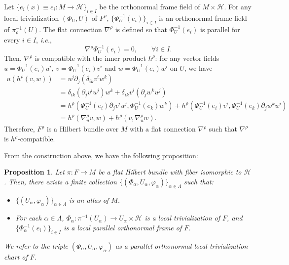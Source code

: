 \documentclass[11pt,oneside,reqno]{amsart}
\newtheorem{proposition}[theorem]{Proposition}
\theoremstyle{definition}
\numberwithin{equation}{section}
\theoremstyle{plain}
\begin{document}
Let $\{e_i(x)\equiv e_i:M\rightarrow \mathcal{H}\}_{i\in I}$ be the orthonormal frame field of $M\times \mathcal{H}$. For any local trivialization $(\Phi_U,U)$ of $F^\rho$, $\{\Phi_U^{-1}(e_i)\}_{i\in I}$ is an orthonormal frame field of $\pi_{\rho}^{-1}(U)$. The flat connection $\nabla^\rho$ is defined so that $\Phi_U^{-1}(e_i)$ is parallel for every $i \in I$, \emph{i.e.}, 
\begin{equation}
    \nabla^\rho \Phi_U^{-1}(e_i) =0, \qquad \forall i\in I.
\end{equation}
Then, $\nabla^\rho$ is compatible with the inner product $h^\rho$: for any vector fields $u = \Phi_U^{-1}(e_i) u^i, \, v = \Phi_U^{-1}(e_i) v^i$ and $w = \Phi_U^{-1}(e_i) w^i$ on $U$, we have
\begin{equation*}
\begin{aligned}
    u (h^\rho (v,w)) &= u^j \partial_j ( \delta_{ik} v^iw^k ) \\
    &=  \delta_{ik} (\partial_j v^i u^j) w^k + \delta_{ik} v^i( \partial_jw^k u^j  ) \\
    &= h^\rho( \Phi_U^{-1}(e_i) \partial_j v^i u^j, \Phi_U^{-1}(e_k)w^k  ) + h^\rho( \Phi_U^{-1}(e_i)v^i, \Phi_U^{-1}(e_k)\partial_j w^ku^j  )  \\
    & = h^{\rho} (\nabla^{\rho}_u v ,w) + h^\rho( v,\nabla^\rho_u w ).
\end{aligned}
\end{equation*}
Therefore, $F^\rho$ is a Hilbert bundle over $M$ with a flat connection $\nabla^\rho$ such that $\nabla^\rho $ is $h^\rho$-compatible.

From the construction above, we have the following proposition:
\begin{proposition}
\label{defoflocaltrivialization}
Let $\pi:F\rightarrow M$ be a flat Hilbert bundle with fiber isomorphic to $\mathcal{H}$. Then, there exists a finite collection $\{(\Phi_\alpha, U_\alpha, \varphi_\alpha)\}_{\alpha \in \Lambda}$ such that:
\begin{itemize}
    \item $\{(U_\alpha, \varphi_\alpha)\}_{\alpha \in \Lambda}$ is an atlas of $M$.
    \item For each $\alpha \in \Lambda$, $\Phi_\alpha : \pi^{-1}(U_\alpha) \rightarrow U_\alpha \times \mathcal{H}$ is a local trivialization of $F$, and $\{ \Phi_\alpha^{-1}(e_i)\}_{i\in I}$ is a local parallel orthonormal frame of $F$.
\end{itemize}
We refer to the triple $(\Phi_\alpha, U_\alpha, \varphi_\alpha)$ as a parallel orthonormal local trivialization chart of $F$.
\end{proposition}
\end{document}
